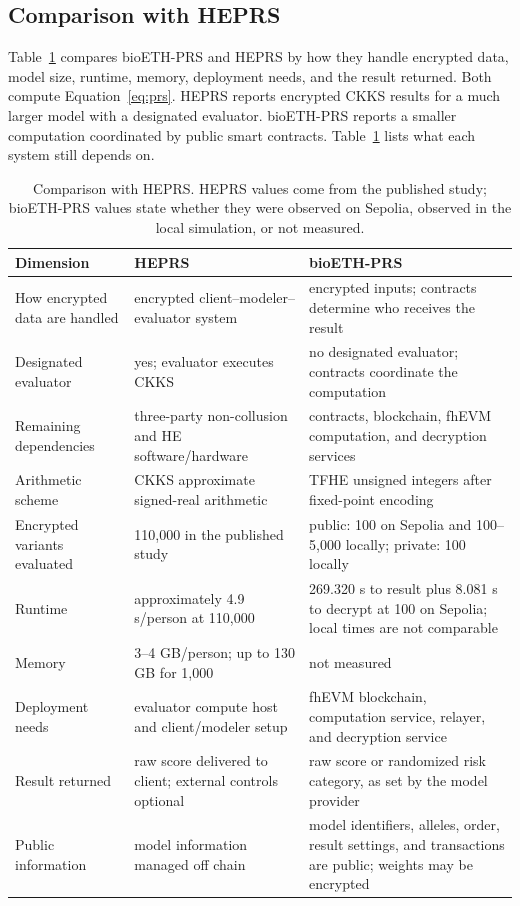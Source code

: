 \documentclass[10pt]{article}
\begin{document}
\subsection{Comparison with HEPRS}

Table~\ref{tab:comparison} compares bioETH-PRS and HEPRS
\citep{knight2026heprs} by how they handle encrypted data, model size, runtime, memory,
deployment needs, and the result returned.  Both compute Equation~\ref{eq:prs}.  HEPRS reports encrypted CKKS
results for a much larger model with a designated evaluator.  bioETH-PRS reports a
smaller computation coordinated by public smart contracts.  Table~\ref{tab:comparison}
lists what each system still depends on.

\begin{table}[t]
\centering
\caption{Comparison with HEPRS. HEPRS values come from the published study;
bioETH-PRS values state whether they were observed on Sepolia, observed in the local
simulation, or not measured.}
\label{tab:comparison}
\footnotesize
\setlength{\tabcolsep}{4pt}
\begin{tabularx}{\textwidth}{@{}p{3.1cm}XX@{}}
\toprule
\textbf{Dimension} & \textbf{HEPRS} \citep{knight2026heprs} & \textbf{bioETH-PRS} \\
\midrule
How encrypted data are handled & encrypted client--modeler--evaluator system & encrypted inputs; contracts determine who receives the result \\
Designated evaluator & yes; evaluator executes CKKS & no designated evaluator; contracts coordinate the computation \\
Remaining dependencies & three-party non-collusion and HE software/hardware & contracts, blockchain, fhEVM computation, and decryption services \\
Arithmetic scheme & CKKS approximate signed-real arithmetic & TFHE unsigned integers after fixed-point encoding \\
Encrypted variants evaluated & 110,000 in the published study & public: 100 on Sepolia and 100--5,000 locally; private: 100 locally \\
Runtime & approximately 4.9 s/person at 110,000 & 269.320 s to result plus 8.081 s to decrypt at 100 on Sepolia; local times are not comparable \\
Memory & 3--4 GB/person; up to 130 GB for 1,000 & not measured \\
Deployment needs & evaluator compute host and client/modeler setup & fhEVM blockchain, computation service, relayer, and decryption service \\
Result returned & raw score delivered to client; external controls optional & raw score or randomized risk category, as set by the model provider \\
Public information & model information managed off chain & model identifiers, alleles, order, result settings, and transactions are public; weights may be encrypted \\
\bottomrule
\end{tabularx}
\end{table}
\end{document}
